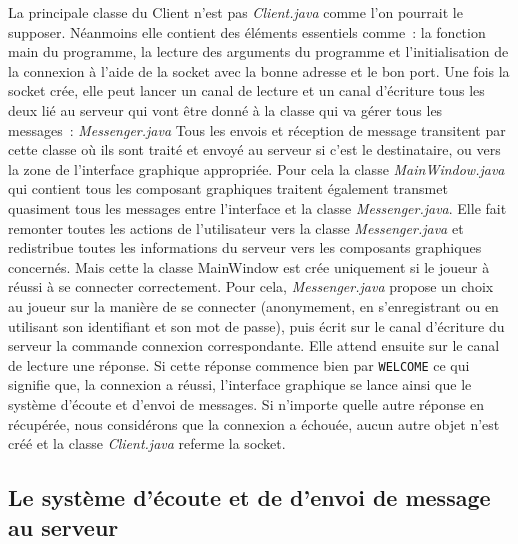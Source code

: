 \documentclass[a4paper, 11pt]{article}
\begin{document}
La principale classe du Client n'est pas \textit{Client.java} comme
l'on pourrait le supposer.
Néanmoins elle contient des éléments essentiels comme : la
fonction main du programme, la lecture des arguments du programme
et l'initialisation de la connexion à l'aide de la socket avec la bonne adresse
et le bon port. Une fois la socket crée, elle peut lancer un canal de
lecture et un canal d'écriture tous les deux lié au serveur qui vont
être donné à la classe qui va gérer tous les messages : \textit{Messenger.java}
Tous les envois et réception de message transitent par cette classe où
ils sont traité et envoyé au serveur si c'est le destinataire, ou vers
la zone de l'interface graphique appropriée. 
Pour cela la classe \textit{MainWindow.java} qui contient tous les composant graphiques
traitent également transmet quasiment tous les messages entre l'interface et
la classe \textit{Messenger.java}. Elle fait remonter toutes les actions de
l'utilisateur vers la classe \textit{Messenger.java} et redistribue toutes les
informations du serveur vers les composants graphiques concernés.
Mais cette la classe MainWindow est crée uniquement si le joueur à
réussi à se connecter correctement. Pour cela, \textit{Messenger.java} propose
un choix au joueur sur la manière de se connecter (anonymement, en
s'enregistrant ou en utilisant son identifiant et son mot de passe),
puis écrit sur le canal d'écriture du serveur la commande connexion
correspondante. Elle attend ensuite sur le canal de lecture une réponse.
Si cette réponse commence bien par \verb+WELCOME+ ce qui signifie que, la
connexion a réussi, l'interface graphique se lance ainsi que le
système d'écoute et d'envoi de messages. Si n'importe quelle autre
réponse en récupérée, nous considérons que la connexion a échouée,
aucun autre objet n'est créé et la classe \textit{Client.java} referme la socket.


\subsection{Le système d'écoute et de d'envoi de message au serveur}
\end{document}
